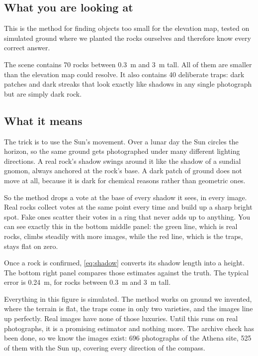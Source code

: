 \documentclass[11pt]{article}
\begin{document}
\subsection{What you are looking at}

This is the method for finding objects too small for the elevation map, tested on
simulated ground where we planted the rocks ourselves and therefore know every correct
answer.

The scene contains \num{70} rocks between \SI{0.3}{\meter} and \SI{3}{\meter} tall.
All of them are smaller than the elevation map could resolve. It also contains
\num{40} deliberate traps: dark patches and dark streaks that look exactly like
shadows in any single photograph but are simply dark rock.

\subsection{What it means}

The trick is to use the Sun's movement. Over a lunar day the Sun circles the horizon,
so the same ground gets photographed under many different lighting directions. A real
rock's shadow swings around it like the shadow of a sundial gnomon, always anchored at
the rock's base. A dark patch of ground does not move at all, because it is dark for
chemical reasons rather than geometric ones.

So the method drops a vote at the base of every shadow it sees, in every image. Real
rocks collect votes at the same point every time and build up a sharp bright spot.
Fake ones scatter their votes in a ring that never adds up to anything. You can see
exactly this in the bottom middle panel: the green line, which is real rocks, climbs
steadily with more images, while the red line, which is the traps, stays flat on zero.

Once a rock is confirmed, \cref{eq:shadow} converts its shadow length into a height.
The bottom right panel compares those estimates against the truth. The typical error
is \SI{0.24}{\meter}, for rocks between \SI{0.3}{\meter} and \SI{3}{\meter} tall.

\begin{limitbox}
Everything in this figure is simulated. The method works on ground we invented, where
the terrain is flat, the traps come in only two varieties, and the images line up
perfectly. Real images have none of those luxuries. Until this runs on real
photographs, it is a promising estimator and nothing more. The archive check has been
done, so we know the images exist: \num{696} photographs of the Athena site, \num{525}
of them with the Sun up, covering every direction of the compass.
\end{limitbox}
\end{document}
